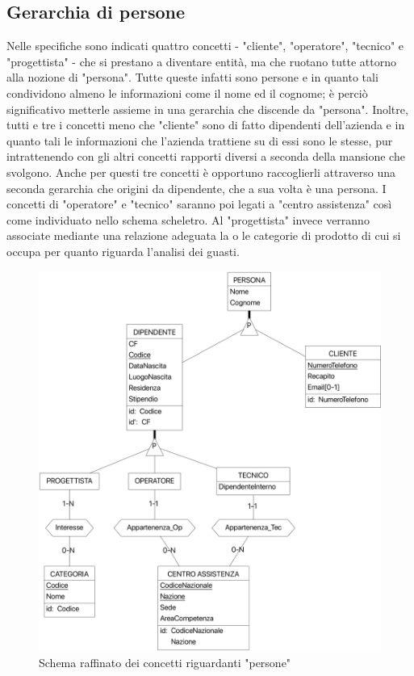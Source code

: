 \documentclass[a4paper, 12pt]{report}
\begin{document}
\subsection{Gerarchia di persone}

Nelle specifiche sono indicati quattro concetti - "cliente", "operatore", "tecnico" e "progettista" - che si prestano a diventare entità, ma
che ruotano tutte attorno alla nozione di "persona". Tutte queste infatti sono persone e in quanto tali condividono almeno le informazioni come il nome
ed il cognome; è perciò significativo metterle assieme in una gerarchia che discende da "persona". Inoltre, tutti e tre i concetti meno che "cliente"
sono di fatto dipendenti dell'azienda e in quanto tali le informazioni che l'azienda trattiene su di essi sono le stesse, pur intrattenendo con gli
altri concetti rapporti diversi a seconda della mansione che svolgono. Anche per questi tre concetti è opportuno raccoglierli attraverso una seconda
gerarchia che origini da dipendente, che a sua volta è una persona. I concetti di "operatore" e "tecnico" saranno poi legati a "centro assistenza"
così come individuato nello schema scheletro. Al "progettista" invece verranno associate mediante una relazione adeguata la o le categorie di prodotto 
di cui si occupa per quanto riguarda l'analisi dei guasti.

\begin{figure}[H]
	\centering
	\includegraphics[width=\linewidth]{images/persone.png}
	\caption{Schema raffinato dei concetti riguardanti "persone"}
\end{figure}
\end{document}
